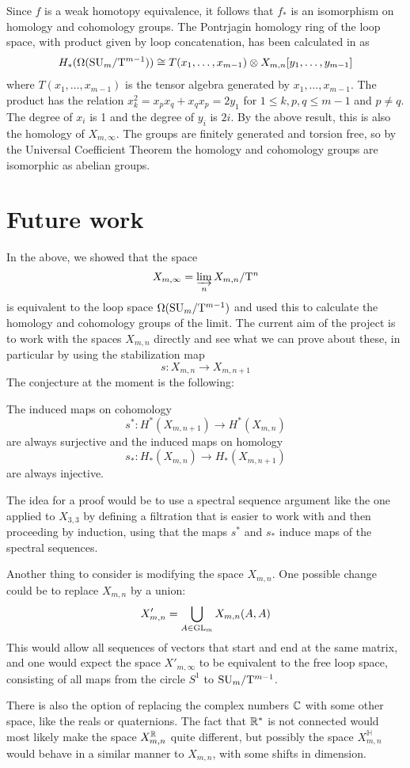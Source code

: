 Since $f$ is a weak homotopy equivalence, it follows that $f_*$ is
an isomorphism on homology and cohomology groups. The Pontrjagin
homology ring of the loop space, with product given by loop
concatenation, has been calculated in \cite[Theorem~4.1]{grbic} as
\begin{align*}
  H_*(\Omega(\mathrm{SU}_{m}/\mathrm{T}^{m-1})) \cong T(x_1,\dots,x_{m-1}) \otimes
  X_{m,n}[y_1,\dots,y_{m-1}]
\end{align*}
where $T(x_1,\dots,x_{m-1})$ is the tensor algebra generated by
$x_1,\dots,x_{m-1}$. The product has the relation $x_k^2 =
x_px_q+x_qx_p = 2y_1$ for $1\leq k,p,q\leq m-1$ and $p\neq q$. The
degree of $x_i$ is 1 and the degree of $y_i$
is $2i$. By the above result, this is also the homology of
$X_{m,\infty}$. The groups are finitely generated and torsion free, so
by the Universal Coefficient Theorem the homology and cohomology
groups are isomorphic as abelian groups.


\section{Future work}

In the above, we showed that the space 
\[ X_{m,\infty} = \varinjlim_n X_{m,n}/\mathrm{T}^n \]
is equivalent to the loop space $\Omega(\mathrm{SU}_{m}/\mathrm{T}^{m-1})$ and used this to
calculate the homology and cohomology groups of the limit. The
current aim of the project is to work with the spaces $X_{m,n}$
directly and see what we can prove about these, in particular by using
the stabilization map
\[ s : X_{m,n} \to X_{m,n+1} \]
The conjecture at the moment is the following:
\begin{conjecture}
  The induced maps on cohomology
  \[ s^* : H^*(X_{m,n+1}) \to H^*(X_{m,n}) \]
  are always surjective and the induced maps on homology
  \[ s_* : H_*(X_{m,n}) \to H_*(X_{m,n+1}) \]
  are always injective.
\end{conjecture}
The idea for a proof would be to use a spectral sequence argument like
the one applied to $X_{3,3}$ by defining a filtration that is easier
to work with and then proceeding by induction, using that the maps
$s^*$ and $s_*$ induce maps of the spectral sequences.

Another thing to consider is modifying the space $X_{m,n}$. One possible
change could be to replace $X_{m,n}$ by a union:
\[ X'_{m,n} = \bigcup_{A\in\mathrm{GL}_m} X_{m,n}(A,A) \]
This would allow all sequences of vectors that start and end at the
same matrix, and one would expect the space $X'_{m,\infty}$ to be
equivalent to the free loop space, consisting of all
maps from the circle $S^1$ to $\mathrm{SU}_{m}/\mathrm{T}^{m-1}$.

There is also the option of replacing the complex numbers $\mathbb{C}$ with
some other space, like the reals or quaternions. The fact that $\mathbb{R}^*$
is not connected would most likely make the space $X_{m,n}^{\mathbb{R}}$ quite
different, but possibly the space $X_{m,n}^{\mathbb{H}}$ would behave in a
similar manner to $X_{m,n}$, with some shifts in dimension.


